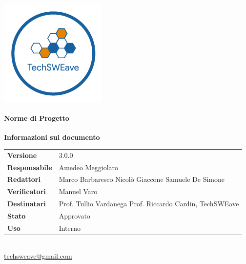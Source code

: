 \documentclass[a4paper]{article}
\begin{document}
\begin{titlepage}
    \begin{center}
        \includegraphics{../../../Images/logo}\\
        \vspace{20px}
        \textcolor{logo}{\hrulefill}\\
        \vspace{20px}
        \textbf{\huge\textcolor{logo}{Norme di Progetto}}\\
        \vspace{10px}
        \textcolor{logo}{\hrulefill}\\
        \vspace{40px}
        \textbf{\Large Informazioni sul documento}\\
        \vspace{20px}
        \begin{tabular}{p{100px} | p{100px}}
            \textbf{Versione}     & 3.0.0                                                                      \\
            \textbf{Responsabile} & Amedeo Meggiolaro                                                          \\
            \textbf{Redattori}    & Marco Barbaresco \newline Nicolò Giaccone \newline Samuele De Simone       \\
            \textbf{Verificatori} & Manuel Varo                                                                \\
            \textbf{Destinatari}  & Prof. Tullio Vardanega \newline Prof. Riccardo Cardin, \newline TechSWEave \\
            \textbf{Stato}        & Approvato                                                                  \\
            \textbf{Uso}          & Interno                                                                    \\
        \end{tabular}\\
        \vspace{60px}
        \href{mailto:techsweave@gmail.com}{techsweave@gmail.com}\\
    \end{center}
\end{titlepage}
\end{document}

